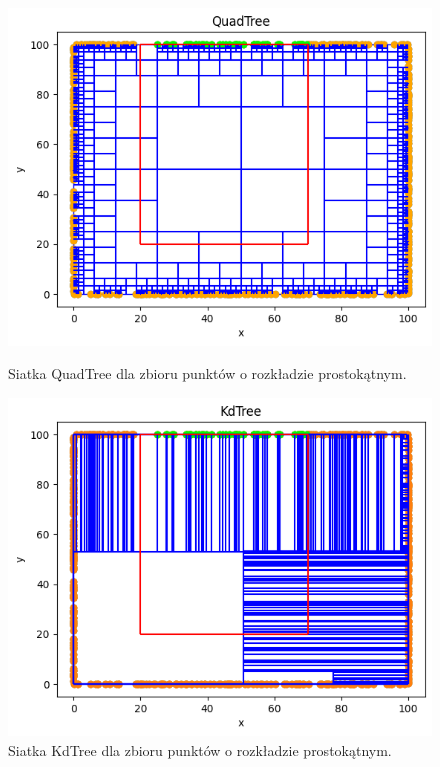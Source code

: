 \documentclass{lab}
\begin{document}
\begin{figure}[H]
  \centering
  \begin{minipage}{0.495\textwidth}
      \centering
      \includegraphics[width=1\textwidth]{resources/rectangle_QuadTree.png}
      \caption{Siatka QuadTree dla zbioru punktów o rozkładzie prostokątnym.}
      \label{fig:rectangle_QuadTree}
  \end{minipage}
  \begin{minipage}{0.495\textwidth}
      \centering
      \includegraphics[width=1\textwidth]{resources/rectangle_KdTree.png}
      \caption{Siatka KdTree dla zbioru punktów o rozkładzie prostokątnym.}
      \label{fig:rectangle_KdTree}
  \end{minipage}
\end{figure}
\end{document}
